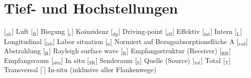 \section*{Tief- und Hochstellungen} 				%
%
\begin{acronym}[------] 					%
		[$_{\mathrm{air}}$]{
		Luft
	}
			[$_{\mathrm{B}}$]{
		Biegung
	}
	     [$_{\mathrm{c}}$]{
		Koinzidenz
	}
		[$_{\mathrm{dp}}$]{
		Driving-point
	}
			[$_{\mathrm{eff}}$]{
		Effektiv
	}
		[$_{\mathrm{int}}$]{
		Intern
	}
			[$_{\mathrm{L}}$]{
		Longitudinal
	}
		[$_{\mathrm{lab}}$]{
		Labor situation
	}
		[$_{\mathrm{n}}$]{
		Normiert auf Bezugsabsorptionsfläche \acs{A}
	}
		[$_{\mathrm{rad}}$]{
		Abstrahlung
	}
			[$_{\mathrm{R}}$]{
		Rayleigh surface wave
	}
			[$_{\mathrm{R}}$]{
		Empfangsstruktur (Receiver)
	}
	    [$_{\mathrm{RR}}$]  {
		Empfangsraum
	}
		[$_{\mathrm{situ}}$]{
		In situ
	}
	    [$_{\mathrm{SR}}$]  {
		Senderaum
	}
			[$_{\mathrm{S}}$]{
		Quelle (Source)
	}
		[$_{\mathrm{tot}}$]{
		Total
	}
			[$_{\mathrm{T}}$]{
		Transversal
	}
	\bigskip 	%
			[$^\prime$]{
		In-situ (inklusive aller Flankenwege)
	}
\end{acronym}

